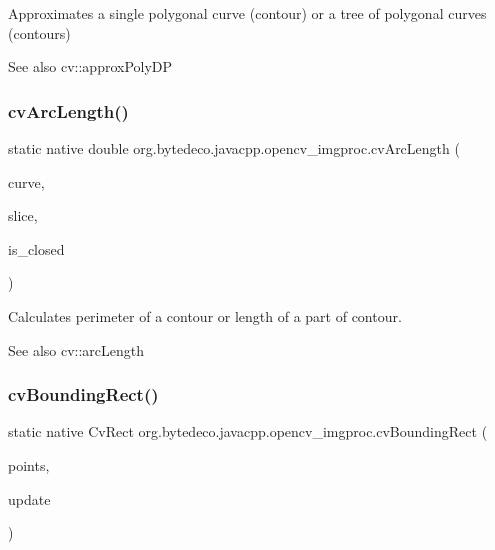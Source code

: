 Approximates a single polygonal curve (contour) or a tree of polygonal curves (contours) 

\begin{DoxySeeAlso}{See also}
cv\+::approx\+Poly\+DP 
\end{DoxySeeAlso}
\mbox{\label{group__imgproc__c_gaf095420cca062536116edaad5f0391ae}} 
\subsubsection{\texorpdfstring{cv\+Arc\+Length()}{cvArcLength()}}
{\footnotesize\ttfamily static native double org.\+bytedeco.\+javacpp.\+opencv\+\_\+imgproc.\+cv\+Arc\+Length (\begin{DoxyParamCaption}\item[{@Const Pointer}]{curve,  }\item[{@By\+Val(null\+Value=\char`\"{}Cv\+Slice(C\+V\+\_\+\+W\+H\+O\+L\+E\+\_\+\+S\+EQ)\char`\"{}) Cv\+Slice}]{slice,  }\item[{int}]{is\+\_\+closed }\end{DoxyParamCaption})\hspace{0.3cm}{\ttfamily [static]}}



Calculates perimeter of a contour or length of a part of contour. 

\begin{DoxySeeAlso}{See also}
cv\+::arc\+Length 
\end{DoxySeeAlso}
\mbox{\label{group__imgproc__c_ga83c0146f56d5c70d0eb462023220933e}} 
\subsubsection{\texorpdfstring{cv\+Bounding\+Rect()}{cvBoundingRect()}}
{\footnotesize\ttfamily static native Cv\+Rect org.\+bytedeco.\+javacpp.\+opencv\+\_\+imgproc.\+cv\+Bounding\+Rect (\begin{DoxyParamCaption}\item[{Cv\+Arr}]{points,  }\item[{int}]{update }\end{DoxyParamCaption})\hspace{0.3cm}{\ttfamily [static]}}



